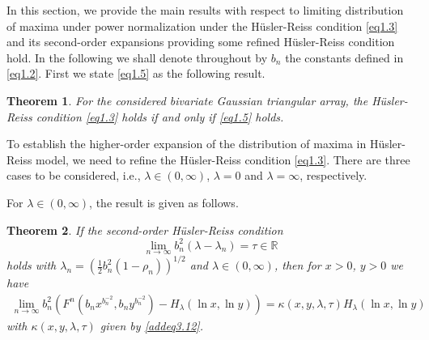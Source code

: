\documentclass[10pt,twosided]{article}
\newtheorem{theorem}{Theorem}[section]
\numberwithin{equation}{section}
\numberwithin{equation}{section}
\newcommand{\R}{\mathbb{R}}
\newcommand{\inr}{\in \R}
\begin{document}
In this section, we provide the main results with respect to
limiting distribution of maxima under power normalization under the
H\"{u}sler-Reiss condition \eqref{eq1.3} and its second-order
expansions providing some refined H\"{u}sler-Reiss condition hold.
In the following we shall denote throughout by $b_n$ the constants
defined in \eqref{eq1.2}. First we state \eqref{eq1.5} as the
following result.
\begin{theorem}\label{thm2.0}
For the considered  bivariate Gaussian triangular array, the
H\"{u}sler-Reiss condition \eqref{eq1.3} holds if and only if
\eqref{eq1.5} holds.
\end{theorem}

To establish the higher-order expansion of the distribution of
maxima in H\"{u}sler-Reiss model, we need to refine the
H\"{u}sler-Reiss condition \eqref{eq1.3}. There are three cases to
be considered, i.e., $\lambda\in (0,\infty)$, $\lambda=0$ and
$\lambda=\infty$, respectively.

For $\lambda\in (0,\infty)$, the result is given as follows.

\begin{theorem}\label{th2.1}
If the second-order H\"{u}sler-Reiss condition
\begin{equation}\label{eq2.1}
\lim_{n\to \infty}b_n^2(\lambda-\lambda_n)=\tau\inr
\end{equation}
holds with $\lambda_n=(\frac{1}{2}b_n^2(1-\rho_n))^{1/2}$ and $\lambda\in (0,\infty)$, then
for $x>0$, $y>0$ we have
\begin{eqnarray}\label{addeq2.2}
\lim_{n\to \infty}b_n^2\left(F^n(b_nx^{b_n^{-2}},b_ny^{b_n^{-2}})-H_{\lambda}(\ln x, \ln y)\right)
=\kappa(x,y,\lambda,\tau)H_{\lambda}(\ln x,\ln y)
\end{eqnarray}
with $\kappa(x,y,\lambda,\tau)$ given by \eqref{addeq3.12}.
\end{theorem}
\end{document}
